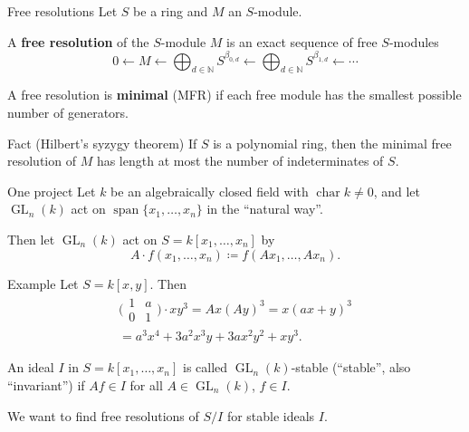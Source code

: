 \documentclass[mathserif
, handout
]{beamer}
\DeclareMathOperator{\GL}{GL}
\DeclareMathOperator{\Char}{char}
\DeclareMathOperator{\Span}{span}
\begin{document}
\begin{frame}{Free resolutions}
    Let $S$ be a ring and $M$ an $S$-module.
    \begin{definition}
    A \textbf{free resolution} of the $S$-module $M$ is an exact sequence of free $S$-modules
    \[0 \leftarrow M \leftarrow \bigoplus_{d\in \mathbb{N}} S^{\beta_{0,d}} \leftarrow \bigoplus_{d\in \mathbb{N}} S^{\beta_{1,d}} \leftarrow \cdots \]

    A free resolution is \textbf{minimal} (MFR) if each free module has the smallest possible number of generators.
\end{definition}

\begin{block}{Fact (Hilbert's syzygy theorem)}
    If $S$ is a polynomial ring, then the minimal free resolution of $M$ has length at most the number of indeterminates of $S$.
\end{block}
\end{frame}

\begin{frame}{One project}
    Let $k$ be an algebraically closed field with $\Char{k}\neq 0$, and let $\GL_n(k)$ act on $\Span\{x_1,\dots,x_n\}$ in the ``natural way''.
    
    Then let $\GL_n(k)$ act on $S = k[x_1,\dots,x_n]$ by 
    \[A\cdot f(x_1,\dots,x_n) \coloneqq f(Ax_1,\dots,Ax_n).\]
    \begin{block}{Example}
        Let $S = k[x,y]$. Then \begin{multline*}
            \big(\!\begin{smallmatrix}
            1 & a \\ 0 & 1
        \end{smallmatrix}\!\big) \cdot xy^3 = Ax(Ay)^3 = x(ax+y)^3 \\ = a^3x^4 +  3 a^2 x^3 y + 3 a x^2 y^2 + xy^3 .
        \end{multline*}
    \end{block}
\end{frame}

\begin{frame}
    An ideal $I$ in $S = k[x_1,\dots,x_n]$ is called $\GL_n(k)$-stable (``stable'', also ``invariant'') if $Af\in I$ for all $A\in \GL_n(k)$, $f\in I$.

    We want to find free resolutions of $S/I$ for stable ideals $I$.
\end{frame}
\end{document}
